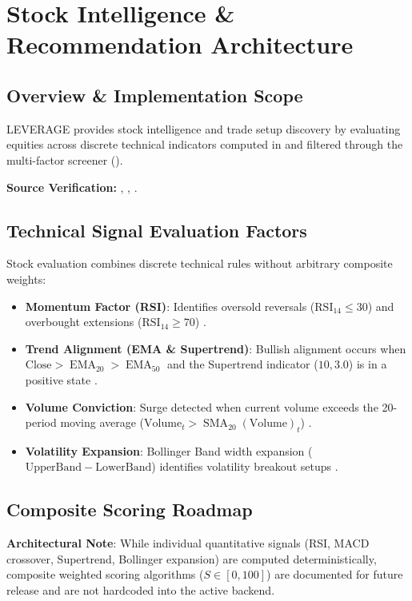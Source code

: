 \chapter{Stock Intelligence \& Recommendation Architecture}
\label{ch:stock_intelligence}

\section{Overview \& Implementation Scope}
LEVERAGE provides stock intelligence and trade setup discovery by evaluating equities across discrete technical indicators computed in  \cite{ref:indicator_service} and filtered through the multi-factor screener ().

\begin{citationbox}
\textbf{Source Verification:} , , .
\end{citationbox}

\section{Technical Signal Evaluation Factors}
Stock evaluation combines discrete technical rules without arbitrary composite weights:
\begin{itemize}[leftmargin=6mm,itemsep=1.5mm]
    \item \textbf{Momentum Factor (RSI)}: Identifies oversold reversals ($\mathrm{RSI}_{14} \le 30$) and overbought extensions ($\mathrm{RSI}_{14} \ge 70$) .
    \item \textbf{Trend Alignment (EMA \& Supertrend)}: Bullish alignment occurs when $\mathrm{Close} > \operatorname{EMA}_{20} > \operatorname{EMA}_{50}$ and the Supertrend indicator ($10, 3.0$) is in a positive state .
    \item \textbf{Volume Conviction}: Surge detected when current volume exceeds the 20-period moving average ($\mathrm{Volume}_t > \operatorname{SMA}_{20}(\mathrm{Volume})_t$) .
    \item \textbf{Volatility Expansion}: Bollinger Band width expansion ($\mathrm{UpperBand} - \mathrm{LowerBand}$) identifies volatility breakout setups .
\end{itemize}

\section{Composite Scoring Roadmap}
\begin{accuracybox}
\textbf{Architectural Note}: While individual quantitative signals (RSI, MACD crossover, Supertrend, Bollinger expansion) are computed deterministically, composite weighted scoring algorithms ($S \in [0, 100]$) are documented for future release  and are not hardcoded into the active backend.
\end{accuracybox}
